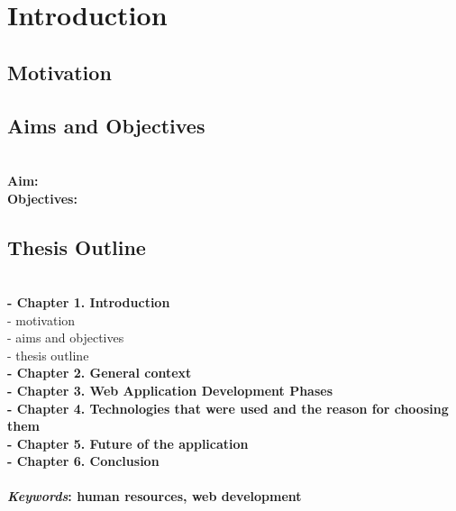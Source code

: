 \chapter{Introduction}\label{ch:intro}
\section{Motivation}
\section{Aims and Objectives}
\\\textbf{Aim:}
\\\textbf{Objectives:}
\section{Thesis Outline}
\\\textbf{- Chapter 1. Introduction}
\\- motivation
\\- aims and objectives
\\- thesis outline
\\\textbf{- Chapter 2. General context} 
\\\textbf{- Chapter 3. Web Application Development Phases}
\\\textbf{- Chapter 4. Technologies that were used and the reason for choosing them}
\\\textbf{- Chapter 5. Future of the application}
\\\textbf{- Chapter 6. Conclusion}
\\
\\\textbf{\emph{Keywords}: human resources, web development}